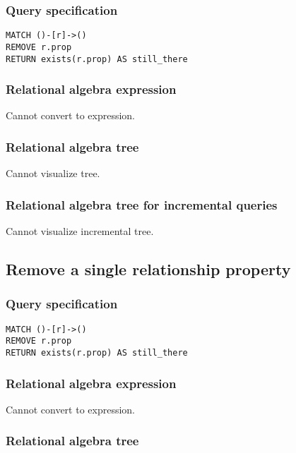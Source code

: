 \subsubsection*{Query specification}

\begin{lstlisting}
MATCH ()-[r]->()
REMOVE r.prop
RETURN exists(r.prop) AS still_there
\end{lstlisting}

\subsubsection*{Relational algebra expression}

Cannot convert to expression.

\subsubsection*{Relational algebra tree}

Cannot visualize tree.

\subsubsection*{Relational algebra tree for incremental queries}

Cannot visualize incremental tree.

\subsection{Remove a single relationship property}

\subsubsection*{Query specification}

\begin{lstlisting}
MATCH ()-[r]->()
REMOVE r.prop
RETURN exists(r.prop) AS still_there
\end{lstlisting}

\subsubsection*{Relational algebra expression}

Cannot convert to expression.

\subsubsection*{Relational algebra tree}

